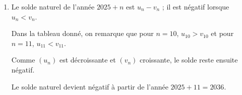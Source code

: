 \begin{enumerate}
\begin{enumerate}
		\item La ligne 12 correspond à $n = 10$ :
		$v_{10} = \np{40000} + 900 \times 10 = \np{49000}$.

		La cellule C12 affiche .
	\end{enumerate}

	\item Le solde naturel de l'année $2025+n$ est $u_n - v_n$ ; il est négatif lorsque $u_n < v_n$.

		Dans la tableau donné, on remarque que pour $n = 10$, $u_{10} > v_{10}$ et pour $n=11$, $u_{11} < v_{11}$.
	
	Comme $(u_n)$ est décroissante et $(v_n)$ croissante, le
	solde reste ensuite négatif.

	Le solde naturel devient négatif à partir de l'année
	$2025 + 11 = 2036$.
\end{enumerate}
